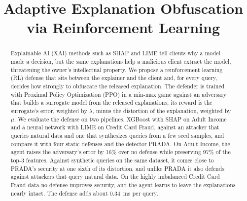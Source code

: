 \documentclass[conference]{IEEEtran}
\DeclareRobustCommand{\revnew}[1]{{\color{revpurple}#1}}
\begin{document}
\title{Adaptive Explanation Obfuscation via Reinforcement Learning}

\author{
\and
{}
\and
{}
\and
{}
}

\maketitle

\begin{abstract}
\revnew{Explainable AI (XAI) methods such as SHAP and LIME tell clients why a model made a decision, but the same explanations help a malicious client extract the model, threatening the owner's intellectual property. We propose a reinforcement learning (RL) defense that sits between the explainer and the client and, for every query, decides how strongly to obfuscate the released explanation. The defender is trained with Proximal Policy Optimization (PPO) in a min-max game against an adversary that builds a surrogate model from the released explanations; its reward is the surrogate's error, weighted by $\lambda$, minus the distortion of the explanation, weighted by $\mu$. We evaluate the defense on two pipelines, XGBoost with SHAP on Adult Income and a neural network with LIME on Credit Card Fraud, against an attacker that queries natural data and one that synthesizes queries from a few seed samples, and compare it with four static defenses and the detector PRADA. On Adult Income, the agent raises the adversary's error by 16\% over no defense while preserving 97\% of the top-3 features. Against synthetic queries on the same dataset, it comes close to PRADA's security at one sixth of its distortion, and unlike PRADA it also defends against attackers that query natural data. On the highly imbalanced Credit Card Fraud data no defense improves security, and the agent learns to leave the explanations nearly intact. The defense adds about 0.34~ms per query.}
\end{abstract}
\end{document}
